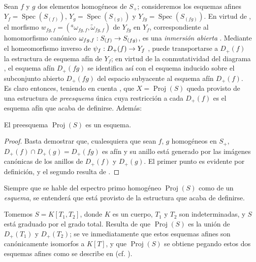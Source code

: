 \documentclass[oneside,10pt]{amsart}
\makeatletter
\newcommand{\ega@arrow}[2]{\mathchoice{#1}{#2}{#2}{#2}}
\renewcommand{\to}{\ega@arrow{\longrightarrow}{\rightarrow}}
\newcommand{\oldpage}[2][]{\marginnote{\normalfont\footnotesize\textbf{#1}~|~#2}\ignorespaces}
\let\EGAOriginalLabel\label
\renewcommand{\label}[1]{\phantomsection\EGAOriginalLabel{#1}}
\makeatother
\begin{document}
\begin{env}[2.4.1]
\label{II.2.4.1-fr}
Sean $f$ y $g$ dos elementos homogéneos de $S_+$; consideremos los esquemas afines
$Y_f=\operatorname{Spec}(S_{(f)})$, $Y_g=\operatorname{Spec}(S_{(g)})$ y $Y_{fg}=\operatorname{Spec}(S_{(fg)})$.
En virtud de , el morfismo
$w_{fg,f}=({}^a\omega_{fg,f},\widetilde{\omega}_{fg,f})$
de $Y_{fg}$ en $Y_f$, correspondiente al homomorfismo canónico $\omega_{fg,f}:S_{(f)}\to S_{(fg)}$, es una \emph{inmersión abierta} .
Mediante el homeomorfismo inverso de $\psi_f:D_+(f)\to Y_f$ , puede transportarse a $D_+(f)$ la estructura de esquema afín de $Y_f$; en virtud de la conmutatividad del diagrama , el esquema afín $D_+(fg)$ se identifica así con el esquema inducido sobre el subconjunto abierto $D_+(fg)$ del espacio subyacente al esquema afín $D_+(f)$.
Es claro entonces, teniendo en cuenta , que $X=\operatorname{Proj}(S)$ queda provisto de una estructura de \emph{preesquema} única cuya restricción a cada $D_+(f)$ es el esquema afín que acaba de definirse.
Además:
\end{env}

\begin{proposition}[2.4.2]
\label{II.2.4.2-fr}
El preesquema $\operatorname{Proj}(S)$ es un esquema.
\end{proposition}

\begin{proof}
Basta  demostrar que, cualesquiera que sean $f$, $g$ homogéneos en $S_+$, $D_+(f)\cap D_+(g)=D_+(fg)$ es afín y su anillo está generado por las imágenes canónicas de los anillos de $D_+(f)$ y $D_+(g)$.
El primer punto es evidente por definición, y el segundo resulta de .
\end{proof}

\oldpage[II]{29}
Siempre que se hable del espectro primo homogéneo $\operatorname{Proj}(S)$ como de un \emph{esquema}, se entenderá que está provisto de la estructura que acaba de definirse.

\begin{example}[2.4.3]
\label{II.2.4.3-fr}
Tomemos $S=K[T_1,T_2]$, donde $K$ es un cuerpo, $T_1$ y $T_2$ son indeterminadas, y $S$ está graduado por el grado total.
Resulta de  que $\operatorname{Proj}(S)$ es la unión de $D_+(T_1)$ y $D_+(T_2)$; se ve inmediatamente que estos esquemas afines son canónicamente isomorfos a $K[T]$, y que $\operatorname{Proj}(S)$ se obtiene pegando estos dos esquemas afines como se describe en  (cf. ).
\end{example}
\end{document}
